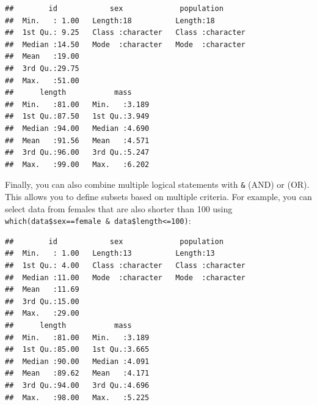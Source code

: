 \documentclass[
]{book}
\newenvironment{Shaded}{\begin{snugshade}}{\end{snugshade}}
\newcommand{\CommentTok}[1]{\textcolor[rgb]{0.56,0.35,0.01}{\textit{#1}}}
\newcommand{\DecValTok}[1]{\textcolor[rgb]{0.00,0.00,0.81}{#1}}
\newcommand{\FunctionTok}[1]{\textcolor[rgb]{0.00,0.00,0.00}{#1}}
\newcommand{\NormalTok}[1]{#1}
\newcommand{\OtherTok}[1]{\textcolor[rgb]{0.56,0.35,0.01}{#1}}
\newcommand{\SpecialCharTok}[1]{\textcolor[rgb]{0.00,0.00,0.00}{#1}}
\newcommand{\StringTok}[1]{\textcolor[rgb]{0.31,0.60,0.02}{#1}}
\begin{document}
\begin{Shaded}
\end{Shaded}

\begin{verbatim}
##        id            sex             population       
##  Min.   : 1.00   Length:18          Length:18         
##  1st Qu.: 9.25   Class :character   Class :character  
##  Median :14.50   Mode  :character   Mode  :character  
##  Mean   :19.00                                        
##  3rd Qu.:29.75                                        
##  Max.   :51.00                                        
##      length           mass      
##  Min.   :81.00   Min.   :3.189  
##  1st Qu.:87.50   1st Qu.:3.949  
##  Median :94.00   Median :4.690  
##  Mean   :91.56   Mean   :4.571  
##  3rd Qu.:96.00   3rd Qu.:5.247  
##  Max.   :99.00   Max.   :6.202
\end{verbatim}

Finally, you can also combine multiple logical statements with \texttt{\&} (AND) or \texttt{\textbar{}} (OR). This allows you to define subsets based on multiple criteria. For example, you can select data from females that are also shorter than 100 using \texttt{which(data\$sex==\textquotesingle{}female\textquotesingle{}\ \&\ data\$length\textless{}=100)}:

\begin{Shaded}
\end{Shaded}

\begin{verbatim}
##        id            sex             population       
##  Min.   : 1.00   Length:13          Length:13         
##  1st Qu.: 4.00   Class :character   Class :character  
##  Median :11.00   Mode  :character   Mode  :character  
##  Mean   :11.69                                        
##  3rd Qu.:15.00                                        
##  Max.   :29.00                                        
##      length           mass      
##  Min.   :81.00   Min.   :3.189  
##  1st Qu.:85.00   1st Qu.:3.665  
##  Median :90.00   Median :4.091  
##  Mean   :89.62   Mean   :4.171  
##  3rd Qu.:94.00   3rd Qu.:4.696  
##  Max.   :98.00   Max.   :5.225
\end{verbatim}
\end{document}
